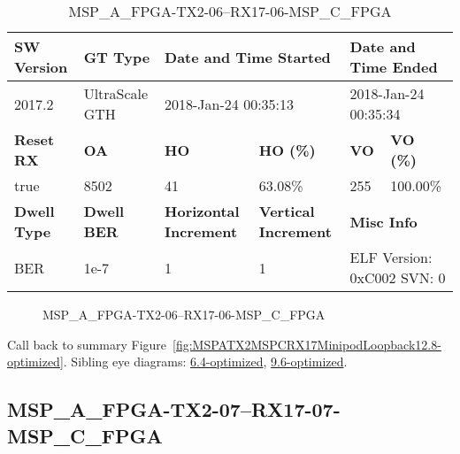 \begin{table}[h]
\centering
\caption{MSP\_A\_FPGA-TX2-06--RX17-06-MSP\_C\_FPGA}
\label{tab:MSPAFPGATX206RX1706MSPCFPGA12.8-optimized}
\begin{tabular}{@{}|l|l|l|l|l|l|@{}}
\toprule
\textbf{SW Version}                & \textbf{GT Type}   & \multicolumn{2}{l|}{\textbf{Date and Time Started}}            & \multicolumn{2}{l|}{\textbf{Date and Time Ended}}        \\ \midrule
2017.2                       & UltraScale GTH          & \multicolumn{2}{l|}{2018-Jan-24 00:35:13}                   & \multicolumn{2}{l|}{2018-Jan-24 00:35:34}               \\ \midrule
\textbf{Reset RX}                  & \textbf{OA} & \textbf{HO}   & \textbf{HO (\%)} & \textbf{VO} & \textbf{VO (\%)} \\ \midrule
true & 8502        & 41          & 63.08\%        & 255        & 100.00\%       \\ \midrule
\textbf{Dwell Type}                & \textbf{Dwell BER} & \textbf{Horizontal Increment} & \textbf{Vertical Increment}    & \multicolumn{2}{l|}{\textbf{Misc Info}}                  \\ \midrule
BER                            & 1e-7        & 1        & 1           & \multicolumn{2}{l|}{ELF Version: 0xC002 SVN: 0}                         \\ \bottomrule
\end{tabular}
\end{table}

\begin{figure}[h]
\caption{MSP\_A\_FPGA-TX2-06--RX17-06-MSP\_C\_FPGA} \label{fig:MSPAFPGATX206RX1706MSPCFPGA12.8-optimized}
\end{figure}

Call back to summary Figure~\ref{fig:MSPATX2MSPCRX17MinipodLoopback12.8-optimized}.
Sibling eye diagrams: \hyperref[sec:MSPAFPGATX206RX1706MSPCFPGA6.4-optimized]{6.4-optimized}, \hyperref[sec:MSPAFPGATX206RX1706MSPCFPGA9.6-optimized]{9.6-optimized}.

\clearpage
\newpage


\subsection{MSP\_A\_FPGA-TX2-07--RX17-07-MSP\_C\_FPGA}\label{sec:MSPAFPGATX207RX1707MSPCFPGA12.8-optimized}

